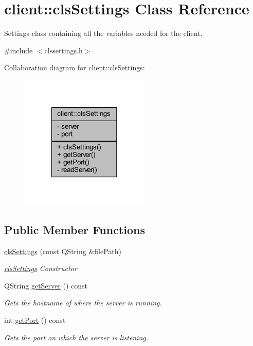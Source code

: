 \hypertarget{classclient_1_1cls_settings}{\section{client\-:\-:cls\-Settings Class Reference}
\label{d5/d08/classclient_1_1cls_settings}
}


Settings class containing all the variables needed for the client.  




{\ttfamily \#include $<$clssettings.\-h$>$}



Collaboration diagram for client\-:\-:cls\-Settings\-:\nopagebreak
\begin{figure}[H]
\begin{center}
\leavevmode
\includegraphics[width=174pt]{dd/d1a/classclient_1_1cls_settings__coll__graph}
\end{center}
\end{figure}
\subsection*{Public Member Functions}
\begin{DoxyCompactItemize}
\item 
\hyperlink{classclient_1_1cls_settings_ac4621f113c6e276f29395d9d2d947217}{cls\-Settings} (const Q\-String \&file\-Path)
\begin{DoxyCompactList}\small\item\em \hyperlink{classclient_1_1cls_settings}{cls\-Settings} Constructor \end{DoxyCompactList}\item 
Q\-String \hyperlink{classclient_1_1cls_settings_aea971041842324e96b90ef6b8b703d54}{get\-Server} () const 
\begin{DoxyCompactList}\small\item\em Gets the hostname of where the server is running. \end{DoxyCompactList}\item 
int \hyperlink{classclient_1_1cls_settings_a9cccda32a83a487cd88ce00de7c45ec1}{get\-Port} () const 
\begin{DoxyCompactList}\small\item\em Gets the port on which the server is listening. \end{DoxyCompactList}\end{DoxyCompactItemize}
